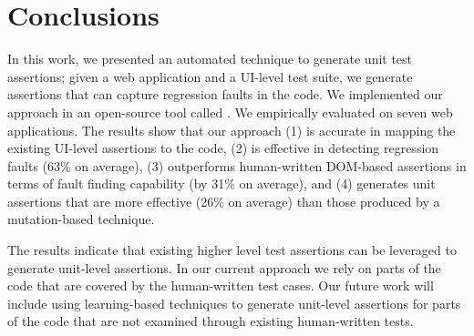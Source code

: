 \section{Conclusions} \label{Sec:concs}
In this work, we presented an automated technique to generate \javascript unit test assertions; given  a web application and a UI-level test suite, we generate assertions that can capture regression faults in the \javascript code. We implemented our approach in an open-source tool called \atrina. We empirically evaluated \atrina on seven web applications. The results show that our approach (1) is accurate in mapping the existing UI-level assertions to the \javascript code, (2) is effective in detecting regression faults (63\% on average), (3) outperforms human-written DOM-based assertions in terms of fault finding capability (by 31\% on average), and (4) generates unit assertions that are more effective (26\% on average) than those produced by a mutation-based technique.

The results indicate that existing higher level test assertions can be leveraged to generate unit-level assertions. In our current approach we rely on parts of the code that are covered by the human-written test cases. Our future work will include using learning-based techniques to generate unit-level assertions for parts of the code that are not examined through existing human-written tests.     
